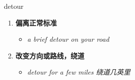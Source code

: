 
\begin{frame}
{\huge detour}
\begin{center}
\begin{enumerate}\Large
  \item \textbf{偏离正常标准}
  \begin{itemize}
    \item \em{\Large{a brief detour on your road}}
  \end{itemize}
  \item \textbf{改变方向或路线，绕道}
  \begin{itemize}
    \item \em{\Large{detour for a few miles 绕道几英里}}
  \end{itemize}
\end{enumerate}
\end{center}
\end{frame}
